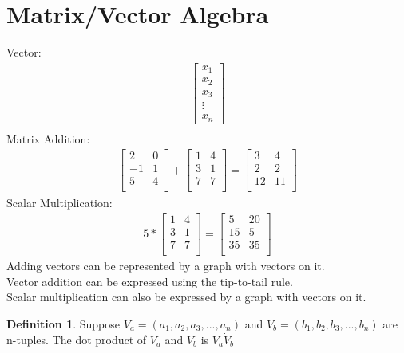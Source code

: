 \documentclass{report}
\theoremstyle{plain}
\theoremstyle{definition}
\newtheorem*{defn}{Definition}
\theoremstyle{plain}
\begin{document}
\section{Matrix/Vector Algebra}
Vector:
\begin{align*}
\begin{bmatrix}
x_1\\ x_2\\ x_3\\ \vdots \\ x_n
\end{bmatrix}\\
\end{align*}
Matrix Addition:
\begin{align*}
\begin{bmatrix}
2 & 0\\
-1 & 1\\
5 & 4\\
\end{bmatrix}
+
\begin{bmatrix}
1 & 4\\
3 & 1\\
7 & 7\\
\end{bmatrix}
=
\begin{bmatrix}
3 & 4\\
2 & 2\\
12 & 11\\
\end{bmatrix}
\end{align*}
Scalar Multiplication:
\begin{align*}
5 *
\begin{bmatrix}
1 & 4\\
3 & 1\\
7 & 7\\
\end{bmatrix}
=
\begin{bmatrix}
5 & 20\\
15 & 5\\
35 & 35\\
\end{bmatrix}
\end{align*}
Adding vectors can be represented by a graph with vectors on it.\\
Vector addition can be expressed using the tip-to-tail rule.\\
Scalar multiplication can also be expressed by a graph with vectors on it.\\

\begin{defn}
Suppose $V_a=(a_1,a_2,a_3,...,a_n)$ and $V_b = (b_1,b_2,b_3,...,b_n)$ are n-tuples. The dot product of $V_a$ and $V_b$ is $V_a \dot V_b$
\end{defn}
\end{document}
